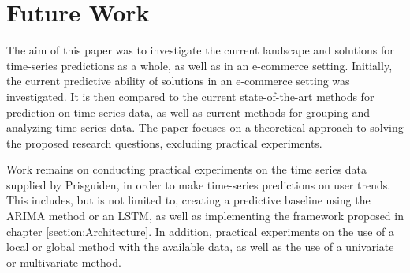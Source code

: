 
\section{Future Work}
\label{sections:Discussion:FutureWork}



% 

The aim of this paper was to investigate the current landscape and solutions for time-series predictions as a whole,
as well as in an e-commerce setting.
Initially, the current predictive ability of solutions in an e-commerce setting was investigated.
It is then compared to the current state-of-the-art methods for prediction on time series data,
as well as current methods for grouping and analyzing time-series data.
The paper focuses on a theoretical approach to solving the proposed research questions,
excluding practical experiments.

Work remains on conducting practical experiments on the time series data supplied by Prisguiden,
in order to make time-series predictions on user trends.
This includes, but is not limited to, creating a predictive baseline using the ARIMA method or an LSTM,
as well as implementing the framework proposed in chapter \ref{section:Architecture}.
In addition, practical experiments on the use of a local or global method with the available data,
as well as the use of a univariate or multivariate method.



\iffalse
Consider where you would like to extend this work. These extensions might either be continuing the ongoing direction or taking a side direction that became obvious during the work. Further, possible solutions to limitations in the work conducted, highlighted in ~\ref{sec:Discussion} may be presented. 
\fi

